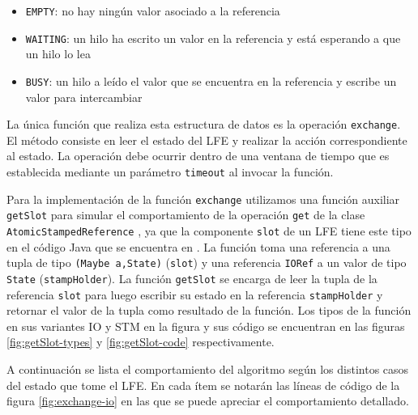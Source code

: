 \begin{itemize}
\item{\texttt{EMPTY}: no hay ningún valor asociado a la referencia}
\item{\texttt{WAITING}: un hilo ha escrito un valor en la referencia y está esperando a que un hilo lo lea}
\item{\texttt{BUSY}: un hilo a leído el valor que se encuentra en la referencia y escribe un valor para intercambiar}
\end{itemize}

La única función que realiza esta estructura de datos es la operación \texttt{exchange}. El método consiste en leer el estado del LFE y realizar la acción correspondiente al estado. La operación debe ocurrir dentro de una ventana de tiempo que es establecida mediante un parámetro \texttt{timeout} al invocar la función.

Para la implementación de la función \texttt{exchange} utilizamos una función auxiliar \texttt{getSlot} para simular el comportamiento de la operación \texttt{get} de la clase \texttt{AtomicStampedReference}  \cite{asr-java}, ya que la componente \texttt{slot} de un LFE tiene este tipo en el código Java que se encuentra en \cite{shavit}.
La función toma una referencia a una tupla de tipo \texttt{(Maybe a,State)} (\texttt{slot}) y una referencia \texttt{IORef} a un valor de tipo \texttt{State} (\texttt{stampHolder}).
La función \texttt{getSlot} se encarga de leer la tupla de la referencia \texttt{slot} para luego escribir su estado en la referencia \texttt{stampHolder} y retornar el valor de la tupla como resultado de la función.
Los tipos de la función en sus variantes IO y STM en la figura y sus código se encuentran en las figuras \ref{fig:getSlot-types} y \ref{fig:getSlot-code} respectivamente.

A continuación se lista el comportamiento del algoritmo según los distintos casos del estado que tome el LFE. En cada ítem se notarán las líneas de código de la figura \ref{fig:exchange-io} en las que se puede apreciar el comportamiento detallado.

